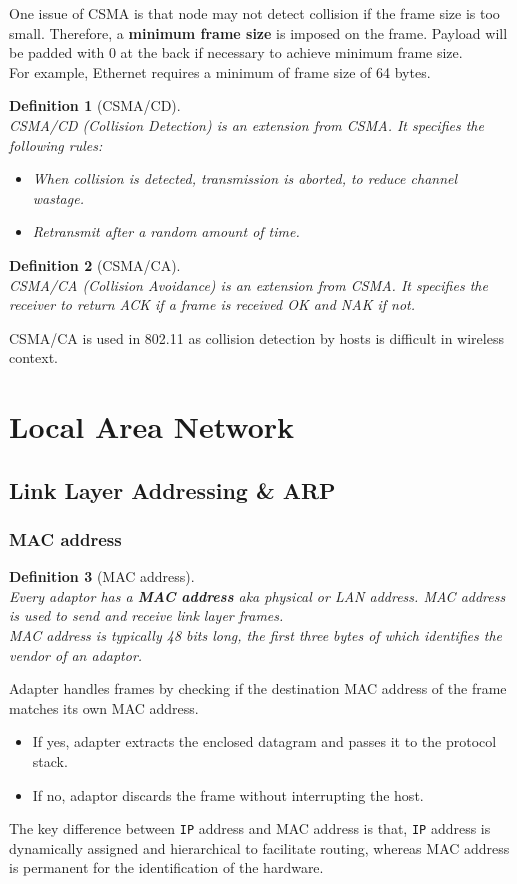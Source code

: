\documentclass[12pt]{article}
\newcommand\IP{\texttt{IP} }
\newtheorem{definition}{Definition}[section]
\theoremstyle{definition}
\begin{document}
One issue of CSMA is that node may not detect collision if the frame size is too small. Therefore, a \textbf{minimum frame size} is imposed on the frame. Payload will be padded with 0 at the back if necessary to achieve minimum frame size.\\For example, Ethernet requires a minimum of frame size of 64 bytes.
\begin{definition}[CSMA/CD]
\hfill\\\normalfont CSMA/CD (Collision Detection) is an extension from CSMA. It specifies the following rules:
\begin{itemize}
  \item When collision is detected, transmission is aborted, to reduce channel wastage.
  \item Retransmit after a random amount of time.
\end{itemize}
\end{definition}
\begin{definition}[CSMA/CA]
\hfill\\\normalfont CSMA/CA (Collision Avoidance) is an extension from CSMA. It specifies the receiver to return ACK if a frame is received OK and NAK if not.
\end{definition}
CSMA/CA is used in 802.11 as collision detection by hosts is difficult in wireless context.
\clearpage
\section{Local Area Network}
\subsection{Link Layer Addressing \& ARP}
\subsubsection{MAC address}
\begin{definition}[MAC address]
\hfill\\\normalfont Every adaptor has a \textbf{MAC address} aka physical or LAN address. MAC address is used to send and receive link layer frames.\\
MAC address is typically 48 bits long, the first three bytes of which identifies the vendor of an adaptor.
\end{definition}
Adapter handles frames by checking if the destination MAC address of the frame matches its own MAC address.
\begin{itemize}
  \item If yes, adapter extracts the enclosed datagram and passes it to the protocol stack.
  \item If no, adaptor discards the frame without interrupting the host.
\end{itemize}
The key difference between \IP address and MAC address is that, \IP address is dynamically assigned and hierarchical to facilitate routing, whereas MAC address is permanent for the identification of the hardware.
\end{document}
